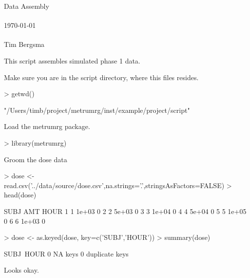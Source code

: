 
\usepackage{Sweave}

 


\vspace*{2cm}
\begin{center}
\vspace{1.5cm}
{\Large Data Assembly}\\
~\\
\today\\
~\\
Tim Bergsma\\
\end{center}
\newpage

This script assembles simulated phase 1 data.

Make sure you are in the script directory, where this files resides.
\begin{Schunk}
\begin{Sinput}
> getwd()
\end{Sinput}
\begin{Soutput}
[1] "/Users/timb/project/metrumrg/inst/example/project/script"
\end{Soutput}
\end{Schunk}
Load the metrumrg package.
\begin{Schunk}
\begin{Sinput}
> library(metrumrg)
\end{Sinput}
\end{Schunk}
Groom the dose data
\begin{Schunk}
\begin{Sinput}
> dose <- read.csv('../data/source/dose.csv',na.strings='.',stringsAsFactors=FALSE)
> head(dose)
\end{Sinput}
\begin{Soutput}
  SUBJ   AMT HOUR
1    1 1e+03    0
2    2 5e+03    0
3    3 1e+04    0
4    4 5e+04    0
5    5 1e+05    0
6    6 1e+03    0
\end{Soutput}
\begin{Sinput}
> dose <- as.keyed(dose, key=c('SUBJ','HOUR'))
> summary(dose)
\end{Sinput}
\begin{Soutput}
SUBJ~HOUR
0 NA keys
0 duplicate keys
\end{Soutput}
\end{Schunk}
Looks okay.

